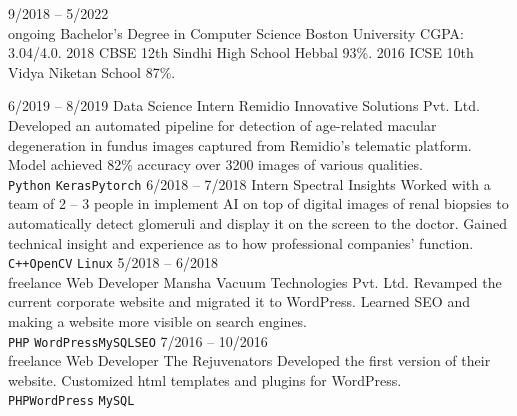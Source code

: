 \documentclass[9pt]{developercv} %
\begin{document}
\vspace{0.5cm}



\begin{entrylist}
	\entry
		{9/2018 -- 5/2022\\\footnotesize{ongoing}}
		{Bachelor's Degree in Computer Science}
		{Boston University}
		{CGPA: 3.04/4.0.}
	\entry
		{2018}
		{CBSE 12th}
		{Sindhi High School Hebbal}
		{93\%.}
	\entry
		{2016}
		{ICSE 10th}
		{Vidya Niketan School}
		{87\%.}
\end{entrylist}



\begin{entrylist}
	\entry
		{6/2019 -- 8/2019}
		{Data Science Intern}
		{Remidio Innovative Solutions Pvt. Ltd.}
		{Developed an automated pipeline for detection of age-related macular 
		degeneration in fundus images captured from Remidio’s telematic platform. Model 
		achieved 82\% accuracy over 3200 images of various qualities.\\ \texttt{Python}
		\slashsep\texttt{Keras}\slashsep\texttt{Pytorch}}
	\entry
		{6/2018 -- 7/2018}
		{Intern}
		{Spectral Insights}
		{Worked with a team of 2 – 3 people in implement AI on top of digital images of 
		renal biopsies to automatically detect glomeruli and display it on the screen to
		the doctor. Gained technical insight and experience as to how professional 
		companies’ function. \\ \texttt{C++}\slashsep\texttt{OpenCV}
		\slashsep\texttt{Linux}}
	\entry
		{5/2018 -- 6/2018\\\footnotesize{freelance}}
		{Web Developer}
		{Mansha Vacuum Technologies Pvt. Ltd.}
		{Revamped the current corporate website and migrated it to WordPress. Learned 
		SEO and making a website more visible on search engines. \\ \texttt{PHP}
		\slashsep\texttt{WordPress}\slashsep\texttt{MySQL}\slashsep\texttt{SEO}}
	\entry
		{7/2016 -- 10/2016\\\footnotesize{freelance}}
		{Web Developer}
		{The Rejuvenators}
		{Developed the first version of their website. Customized html templates and 
		plugins for WordPress. \\ \texttt{PHP}\slashsep\texttt{WordPress}\slashsep
		\texttt{MySQL}}
\end{entrylist}
\end{document}
